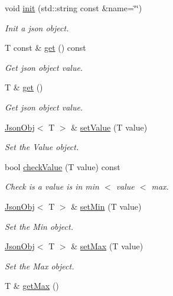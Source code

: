 \begin{DoxyCompactItemize}
void \hyperlink{class_json_obj_ab79b8466cedd54ed6a4e9fc68d309f16}{init} (std\+::string const \&name=\char`\"{}\char`\"{})
\begin{DoxyCompactList}\small\item\em Init a json object. \end{DoxyCompactList}\item 
T const  \& \hyperlink{class_json_obj_af4da480aa1a66ca266c3f91b6f5b9a29}{get} () const
\begin{DoxyCompactList}\small\item\em Get json object value. \end{DoxyCompactList}\item 
T \& \hyperlink{class_json_obj_a9f155bae279621cb40189b9488d0a3a0}{get} ()
\begin{DoxyCompactList}\small\item\em Get json object value. \end{DoxyCompactList}\item 
\hyperlink{class_json_obj}{Json\+Obj}$<$ T $>$ \& \hyperlink{class_json_obj_ad5e2bad4e1063f55426001693f58669b}{set\+Value} (T value)
\begin{DoxyCompactList}\small\item\em Set the Value object. \end{DoxyCompactList}\item 
bool \hyperlink{class_json_obj_a42d298beda8a0b5ea4028f1cef533b0c}{check\+Value} (T value) const
\begin{DoxyCompactList}\small\item\em Check is a value is in min $<$ value $<$ max. \end{DoxyCompactList}\item 
\hyperlink{class_json_obj}{Json\+Obj}$<$ T $>$ \& \hyperlink{class_json_obj_a5a0f45d2936db6dbe79a2ad894437d2f}{set\+Min} (T value)
\begin{DoxyCompactList}\small\item\em Set the Min object. \end{DoxyCompactList}\item 
\hyperlink{class_json_obj}{Json\+Obj}$<$ T $>$ \& \hyperlink{class_json_obj_aad53b4a80d338b4177bcde33292ae6f5}{set\+Max} (T value)
\begin{DoxyCompactList}\small\item\em Set the Max object. \end{DoxyCompactList}\item 
T \& \hyperlink{class_json_obj_a177bcc3c169c4fb25f6d5833dc5d1fc6}{get\+Max} ()

\end{DoxyCompactItemize}
